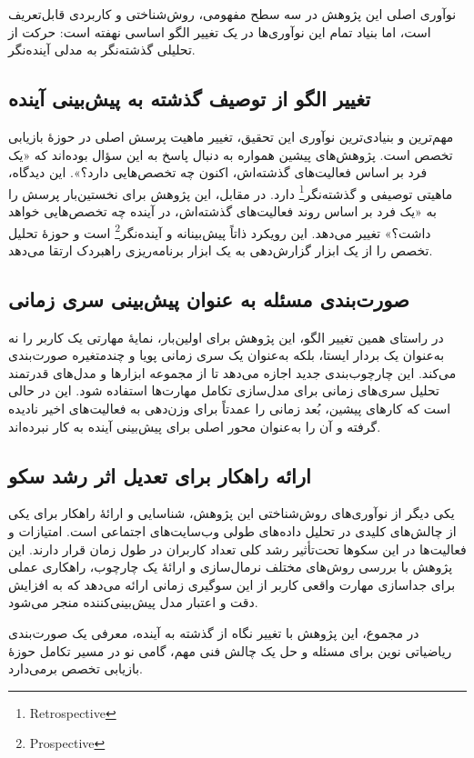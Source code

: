 نوآوری اصلی این پژوهش در سه سطح مفهومی، روش‌شناختی و کاربردی قابل‌تعریف است، اما بنیاد تمام این نوآوری‌ها در یک تغییر الگو اساسی نهفته است: حرکت از تحلیلی گذشته‌نگر به مدلی آینده‌نگر.

\subsection*{تغییر الگو از توصیف گذشته به پیش‌بینی آینده}
مهم‌ترین و بنیادی‌ترین نوآوری این تحقیق، تغییر ماهیت پرسش اصلی در حوزهٔ بازیابی تخصص است. پژوهش‌های پیشین همواره به دنبال پاسخ به این سؤال بوده‌اند که «یک فرد بر اساس فعالیت‌های گذشته‌اش، اکنون چه تخصص‌هایی دارد؟». این دیدگاه، ماهیتی توصیفی و گذشته‌نگر\footnote{Retrospective} دارد. در مقابل، این پژوهش برای نخستین‌بار پرسش را به «یک فرد بر اساس روند فعالیت‌های گذشته‌اش، در آینده چه تخصص‌هایی خواهد داشت؟» تغییر می‌دهد. این رویکرد ذاتاً پیش‌بینانه و آینده‌نگر\footnote{Prospective} است و حوزهٔ تحلیل تخصص را از یک ابزار گزارش‌دهی به یک ابزار برنامه‌ریزی راهبردک ارتقا می‌دهد.

\subsection*{صورت‌بندی مسئله به عنوان پیش‌بینی سری زمانی}
در راستای همین تغییر الگو، این پژوهش برای اولین‌بار، نمایهٔ مهارتی یک کاربر را نه به‌عنوان یک بردار ایستا، بلکه به‌عنوان یک سری زمانی پویا و چندمتغیره صورت‌بندی می‌کند. این چارچوب‌بندی جدید اجازه می‌دهد تا از مجموعه ابزارها و مدل‌های قدرتمند تحلیل سری‌های زمانی برای مدل‌سازی تکامل مهارت‌ها استفاده شود. این در حالی است که کارهای پیشین، بُعد زمانی را عمدتاً برای وزن‌دهی به فعالیت‌های اخیر نادیده گرفته و آن را به‌عنوان محور اصلی برای پیش‌بینی آینده به کار نبرده‌اند.

\subsection*{ارائه راهکار برای تعدیل اثر رشد سکو}
یکی دیگر از نوآوری‌های روش‌شناختی این پژوهش، شناسایی و ارائهٔ راهکار برای یکی از چالش‌های کلیدی در تحلیل داده‌های طولی وب‌سایت‌های اجتماعی است. امتیازات و فعالیت‌ها در این سکو‌ها تحت‌تأثیر رشد کلی تعداد کاربران در طول زمان قرار دارند. این پژوهش با بررسی روش‌های مختلف نرمال‌سازی و ارائهٔ یک چارچوب، راهکاری عملی برای جداسازی مهارت واقعی کاربر از این سوگیری زمانی ارائه می‌دهد که به افزایش دقت و اعتبار مدل پیش‌بینی‌کننده منجر می‌شود.

در مجموع، این پژوهش با تغییر نگاه از گذشته به آینده، معرفی یک صورت‌بندی ریاضیاتی نوین برای مسئله و حل یک چالش فنی مهم، گامی نو در مسیر تکامل حوزهٔ بازیابی تخصص برمی‌دارد.

